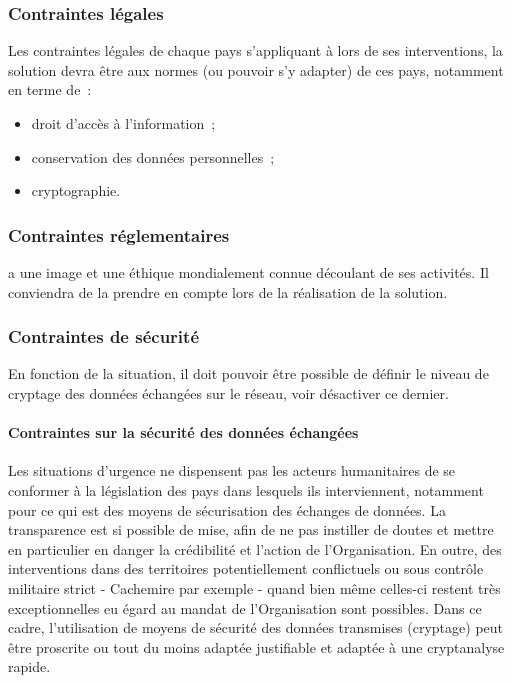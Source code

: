 \subsubsection{Contraintes légales}
Les contraintes légales de chaque pays s'appliquant à \mo lors de ses interventions, la solution devra être aux normes (ou pouvoir s'y adapter) de ces pays, notamment en terme de~:
\begin{itemize}
\item droit d'accès à l'information~;
\item conservation des données personnelles~;
\item cryptographie.
\end{itemize}

\subsubsection{Contraintes réglementaires}
\mo a une image et une éthique mondialement connue découlant de ses activités. Il conviendra de la prendre en compte lors de la réalisation de la solution.

\subsubsection{Contraintes de sécurité}
En fonction de la situation, il doit pouvoir être possible de définir le niveau de cryptage des données échangées sur le réseau, voir désactiver ce dernier.

\paragraph{Contraintes sur la sécurité des données échangées}
Les situations d'urgence ne dispensent pas les acteurs humanitaires de se conformer à la législation des pays dans lesquels ils interviennent, notamment pour ce qui est des moyens de sécurisation des échanges de données. La transparence est si possible de mise, afin de ne pas instiller de doutes et mettre en particulier en danger la crédibilité et l'action de l'Organisation. En outre, des interventions dans des territoires potentiellement conflictuels ou sous contrôle militaire strict - Cachemire par exemple - quand bien même celles-ci restent très exceptionnelles eu égard au mandat de l'Organisation sont possibles. Dans ce cadre, l'utilisation de moyens de sécurité des données transmises (cryptage) peut être proscrite ou tout du moins adaptée justifiable et adaptée à une cryptanalyse \og{}rapide\fg{}.

